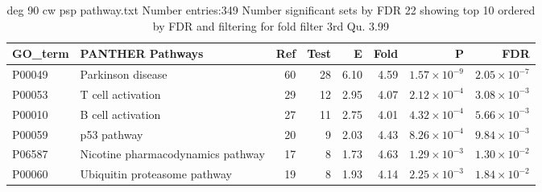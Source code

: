 \begin{table}[ht]
\centering
\begin{tabular}{llrrrrrr}
  \hline
GO\_term & PANTHER Pathways & Ref & Test & E & Fold & P & FDR \\ 
  \hline
P00049 & Parkinson disease  & 60 & 28 & 6.10 & 4.59 & $1.57 \times 10^{-9}$ & $2.05 \times 10^{-7}$ \\ 
  P00053 & T cell activation  & 29 & 12 & 2.95 & 4.07 & $2.12 \times 10^{-4}$ & $3.08 \times 10^{-3}$ \\ 
  P00010 & B cell activation  & 27 & 11 & 2.75 & 4.01 & $4.32 \times 10^{-4}$ & $5.66 \times 10^{-3}$ \\ 
  P00059 & p53 pathway  & 20 & 9 & 2.03 & 4.43 & $8.26 \times 10^{-4}$ & $9.84 \times 10^{-3}$ \\ 
  P06587 & Nicotine pharmacodynamics pathway  & 17 & 8 & 1.73 & 4.63 & $1.29 \times 10^{-3}$ & $1.30 \times 10^{-2}$ \\ 
  P00060 & Ubiquitin proteasome pathway  & 19 & 8 & 1.93 & 4.14 & $2.25 \times 10^{-3}$ & $1.84 \times 10^{-2}$ \\ 
  \hline
\end{tabular}
\caption{deg 90 cw psp pathway.txt Number entries:349 Number significant sets by FDR 22 showing top 10 ordered by FDR and filtering for fold filter 3rd Qu. 3.99} 
\label{tab:deg 90 cw psp pathway.txt Number entries:349 Number significant sets by FDR 22 showing top 10 ordered by FDR and filtering for fold filter 3rd Qu. 3.99}
\end{table}

